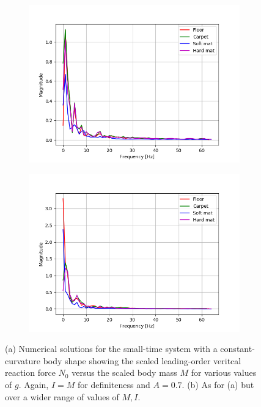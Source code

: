 \documentclass[USenglish]{ifimaster}  %
\begin{document}
\begin{figure}[h] \ContinuedFloat	
	\begin{subfigure}[b]{0.95\textwidth}
		\includegraphics[width=1\linewidth]{Figures/ffty}
		\caption{}
		\label{fig:ffty}
	\end{subfigure}


	\begin{subfigure}[h]{0.95\textwidth}
		\includegraphics[width=1\linewidth]{Figures/fftz}
		\caption{}
		\label{fig:fftz}
	\end{subfigure}
	
	\caption[Two numerical solutions]{(a) Numerical solutions for the small-time system 
		with a constant-curvature body shape showing the scaled leading-order veritcal 
		reaction force $N_0$ versus the scaled body mass $M$ for various values of $g$. 
		Again, $I=M$ for definiteness and $A=0.7$. (b) As for (a) but over a wider range of 
		values of $M,I$.}
	\label{fig:fftxyz}
\end{figure}
\FloatBarrier
\end{document}
